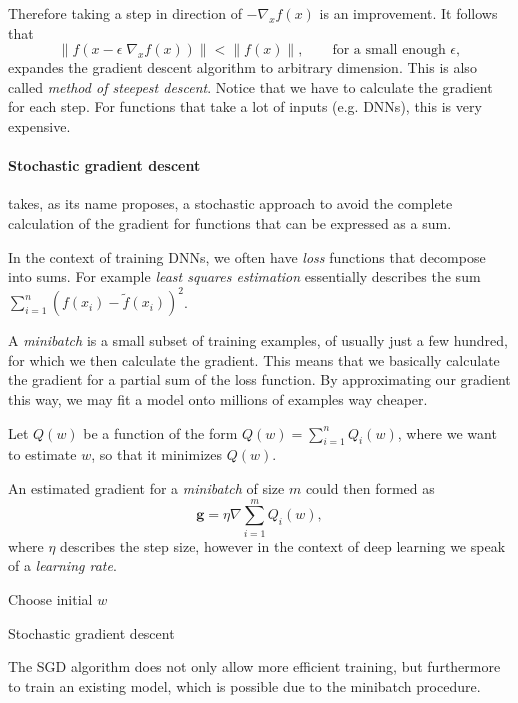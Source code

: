 Therefore taking a step in direction of \(-\nabla_x f(x)\) is an improvement.
It follows that
\begin{equation}
    \lVert f(x - \epsilon \; \nabla_x f(x)) \rVert < \lVert f(x) \rVert, \qquad \text{for a small enough } \epsilon,
\end{equation}
expandes the gradient descent algorithm to arbitrary dimension. This is also called \emph{method of steepest descent}.
Notice that we have to calculate the gradient for each step.
For functions that take a lot of inputs (e.g. DNNs), this is very expensive.

\paragraph{Stochastic gradient descent} takes, as its name proposes, a stochastic approach to avoid the complete calculation of the gradient for functions that can be expressed as a sum.

In the context of training DNNs, we often have \emph{loss} functions that decompose into sums.
For example \emph{least squares estimation} essentially describes the sum \(\sum^{n}_{i = 1} (f(x_i) - \tilde{f}(x_i))^2\).

A \emph{minibatch} is a small subset of training examples, of usually just a few hundred, for which we then calculate the gradient.
This means that we basically calculate the gradient for a partial sum of the loss function.
By approximating our gradient this way, we may fit a model onto millions of examples way cheaper. 

Let \(Q(w)\) be a function of the form \(Q(w) = \sum^{n}_{i = 1} Q_i(w)\), where we want to estimate \(w\), so that it minimizes \(Q(w)\).

An estimated gradient for a \emph{minibatch} of size \(m\) could then formed as
\begin{equation}
    \boldsymbol{g} = \eta \nabla \sum^{m}_{i = 1} Q_i(w),
\end{equation}
where \(\eta\) describes the step size, however in the context of deep learning we speak of a \emph{learning rate}.

\begin{algorithm}[H]
    Choose initial $w$\;
    \caption{Stochastic gradient descent}
\end{algorithm}
The SGD algorithm does not only allow more efficient training, but furthermore to train an existing model, which is possible due to the minibatch procedure.

